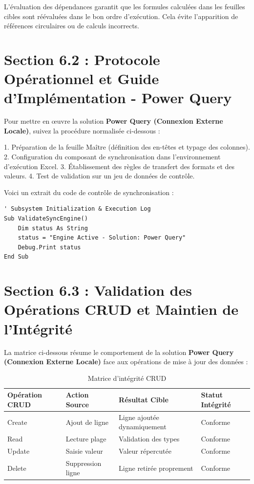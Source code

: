 \documentclass[12pt,a4paper]{report}
\begin{document}
L'évaluation des dépendances garantit que les formules calculées dans les feuilles cibles sont réévaluées dans le bon ordre d'exécution. Cela évite l'apparition de références circulaires ou de calculs incorrects.


\section{Section 6.2 : Protocole Opérationnel et Guide d'Implémentation - Power Query}
Pour mettre en œuvre la solution \textbf{Power Query (Connexion Externe Locale)}, suivez la procédure normalisée ci-dessous :

1. Préparation de la feuille Maître (définition des en-têtes et typage des colonnes).
2. Configuration du composant de synchronisation dans l'environnement d'exécution Excel.
3. Établissement des règles de transfert des formats et des valeurs.
4. Test de validation sur un jeu de données de contrôle.

Voici un extrait du code de contrôle de synchronisation :
\begin{lstlisting}[caption=Code de controle operationnel]
' Subsystem Initialization & Execution Log
Sub ValidateSyncEngine()
    Dim status As String
    status = "Engine Active - Solution: Power Query"
    Debug.Print status
End Sub
\end{lstlisting}


\section{Section 6.3 : Validation des Opérations CRUD et Maintien de l'Intégrité}
La matrice ci-dessous résume le comportement de la solution \textbf{Power Query (Connexion Externe Locale)} face aux opérations de mise à jour des données :

\begin{table}[h]
\centering
\begin{tabular}{@{}llll@{}}
\toprule
\textbf{Opération CRUD} & \textbf{Action Source} & \textbf{Résultat Cible} & \textbf{Statut Intégrité} \\ \midrule
Create & Ajout de ligne & Ligne ajoutée dynamiquement & Conforme \\
Read & Lecture plage & Validation des types & Conforme \\
Update & Saisie valeur & Valeur répercutée & Conforme \\
Delete & Suppression ligne & Ligne retirée proprement & Conforme \\ \bottomrule
\end{tabular}
\caption{Matrice d'intégrité CRUD}
\end{table}
\end{document}
